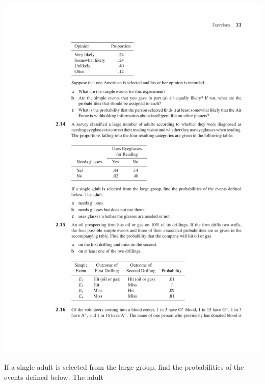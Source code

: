 \documentclass[12pt,reqno]{amsart}
\begin{document}
\medskip
\begin{center}
\includegraphics[scale=1]{pic.pdf}
\end{center}
\medskip

If a single adult is selected from the large group, find the probabilities of the events defined below. The adult
\end{document}

